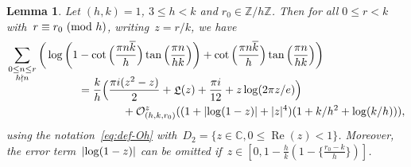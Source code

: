 \documentclass[11pt]{amsart}
\newcommand{\C}{\mathbb{C}}
\newcommand{\Z}{\mathbb{Z}}
\renewcommand{\mod}[1]{~\pr{\textnormal{mod}~#1}}
\newtheorem{lemma}{Lemma}
\theoremstyle{definition}
\newcommand{\ssum}[1]{\sum_{\substack{#1}}}
\newcommand{\pr}[1]{\mathchoice{\left( #1\right)}{(#1)}{(#1)}{(#1)}}
\newcommand{\Oh}{\mathcal{O}}
\DeclareMathOperator{\Lie}{{\mathfrak L}}
\renewcommand\Re{\operatorname{Re}}
\newcommand{\1}{{\mathbf 1}}
\newcommand{\abs}[1]{\left|#1\right|}
\let\originalleft\left
\let\originalright\right
\renewcommand{\left}{\mathopen{}\mathclose\bgroup\originalleft}
\renewcommand{\right}{\aftergroup\egroup\originalright}
\numberwithin{equation}{section}
\begin{document}
\begin{lemma}\label{madc}
  Let $(h,k)=1$, $3\leq h<k$ and $r_0\in\Z/h\Z$. Then for all $0\leq r<k$ with~$r\equiv r_0\mod{h}$, writing~$z=r/k$, we have
  \begin{align*}
    \ssum{0\leq n\leq r\\ h\nmid n}\bigg(\log \bigg(1&-\cot\Big( \frac{\pi n\overline k }{h} \Big)\tan\Big( \frac { \pi n}{hk} \Big)\bigg)+\cot\Big( \frac{\pi n\overline k }{h} \Big)\tan\Big( \frac { \pi n}{hk}\Big)\bigg)\\[-1em]
    {}& =\frac kh\Big(\frac{\pi i (z^2-z)}{2}+\Lie(z)+\frac{\pi i }{12}+z \log(2 \pi z/e)\Big) \\
    {}& \qquad\qquad +\Oh_{(h,k,r_0)}^{z}((1+\abs{\log(1-z)} + |z|^4)(1+k/h^2 + \log(k/h))),
  \end{align*}
  using the notation~\eqref{eq:def-Oh} with~$D_2 = \{z\in\C, 0\leq \Re(z) < 1\}$. Moreover, the error term~$\abs{\log(1-z)}$ can be omitted if~$z \in [0, 1 - \frac hk(1-\{\frac{r_0-k}h\})]$.
\end{lemma}
\end{document}
